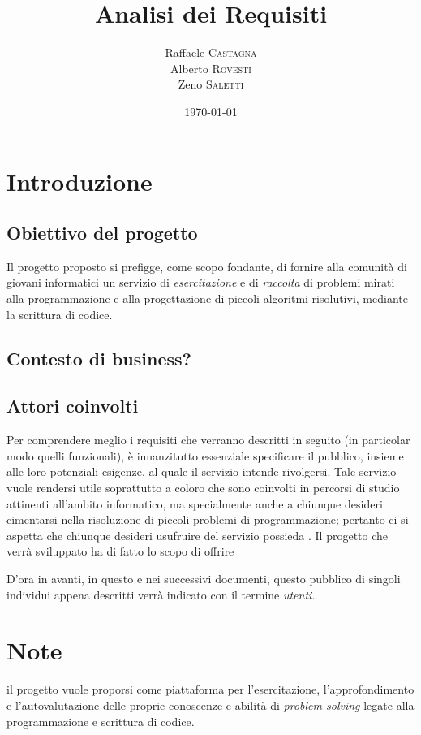 \documentclass[11pt, a4paper]{article}
\title{Analisi dei Requisiti}
\author{Raffaele \textsc{Castagna}\\
Alberto \textsc{Rovesti}\\
Zeno \textsc{Saletti}}
\date{\today}
\begin{document}


\tableofcontents


\newpage
\section{Introduzione}

\subsection{Obiettivo del progetto}
Il progetto proposto si prefigge, come scopo fondante, di fornire alla comunità
di giovani informatici un servizio di \textit{esercitazione} e di
\textit{raccolta} di problemi mirati alla programmazione e alla progettazione
di piccoli algoritmi risolutivi, mediante la scrittura di codice.

\subsection{Contesto di business?}



\subsection{Attori coinvolti}
Per comprendere meglio i requisiti che verranno descritti in seguito (in
particolar modo quelli funzionali), è innanzitutto essenziale specificare
il pubblico, insieme alle loro potenziali esigenze, al quale il servizio
intende rivolgersi.
Tale servizio vuole rendersi utile soprattutto a coloro che sono coinvolti
in percorsi di studio attinenti all'ambito informatico, ma specialmente anche
a chiunque desideri cimentarsi nella risoluzione di piccoli problemi di
programmazione; pertanto ci si aspetta che chiunque desideri usufruire del
servizio possieda . Il progetto che verrà sviluppato ha di fatto lo scopo di
offrire

D'ora in avanti, in questo e nei successivi documenti, questo pubblico di
singoli individui appena descritti verrà indicato con il termine
\textit{utenti}.


\section*{Note}

il progetto vuole proporsi come piattaforma per
l'esercitazione, l'approfondimento e l'autovalutazione delle proprie conoscenze
e abilità di \textit{problem solving} legate alla programmazione e scrittura di
codice.
\end{document}
